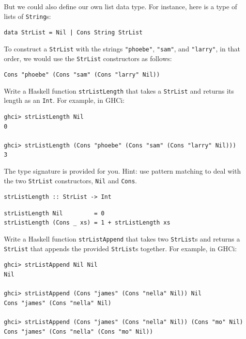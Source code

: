 \documentclass[addpoints,answers]{exam}
\begin{document}
\begin{questions}
But we could also define our own list data type.  For instance, here is a type of lists of \verb|String|s:

\begin{verbatim}
data StrList = Nil | Cons String StrList
\end{verbatim}

To construct a \verb|StrList| with the strings \verb|"phoebe"|, \verb|"sam"|, and \verb|"larry"|, in that order, we would use the \verb|StrList| constructors as follows:

\begin{verbatim}
Cons "phoebe" (Cons "sam" (Cons "larry" Nil))
\end{verbatim}

\question[7] Write a Haskell function \verb|strListLength| that takes a \verb|StrList| and returns its length as an \verb|Int|.  For example, in GHCi:

\begin{verbatim}
ghci> strListLength Nil
0

ghci> strListLength (Cons "phoebe" (Cons "sam" (Cons "larry" Nil)))
3
\end{verbatim}

The type signature is provided for you.  Hint: use pattern matching to deal with the two \verb|StrList| constructors, \verb|Nil| and \verb|Cons|.

\begin{verbatim}
strListLength :: StrList -> Int
\end{verbatim}
\begin{solutionorbox}[3in]
\begin{verbatim}
strListLength Nil         = 0
strListLength (Cons _ xs) = 1 + strListLength xs
\end{verbatim}
\end{solutionorbox}

\newpage

\question[7] Write a Haskell function \verb|strListAppend| that takes two \verb|StrList|s and returns a \verb|StrList| that appends the provided \verb|StrList|s together.  For example, in GHCi:

\begin{verbatim}
ghci> strListAppend Nil Nil
Nil

ghci> strListAppend (Cons "james" (Cons "nella" Nil)) Nil
Cons "james" (Cons "nella" Nil)

ghci> strListAppend (Cons "james" (Cons "nella" Nil)) (Cons "mo" Nil)
Cons "james" (Cons "nella" (Cons "mo" Nil))


\end{verbatim}
\end{questions}
\end{document}
